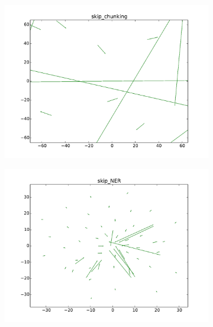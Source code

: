 \begin{figure}
\caption{Updated vs. no-updated word representations for POS-tagging and chunking using skip-gram}
\centering
\begin{subfigure}[b]{0.48\textwidth}
	\centering
    \includegraphics[width=\textwidth]{plots/vectorField/Lizhen/scaled/Lizhen_skip_chunking}
	\label{fig:skipChu}
\end{subfigure}
\begin{subfigure}[b]{0.48\textwidth}
	\centering
    \includegraphics[width=\textwidth]{plots/vectorField/Lizhen/Lizhen_skip_NER}    	
	\label{fig:skippos}	
\end{subfigure}
\label{fig:vectorfield}
\end{figure}

